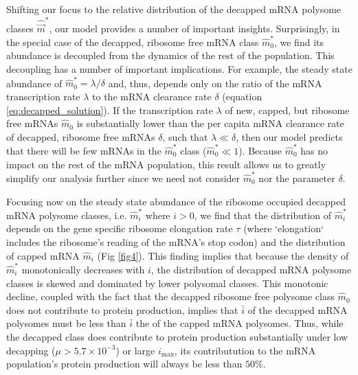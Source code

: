 \documentclass[10pt,letterpaper]{article}
\newcommand{\imax}{\ensuremath{{i_{\max}}}\xspace}
\newcommand{\mhat}{\ensuremath{\hat{m}}\xspace}
\newcommand{\mvec}{\ensuremath{\vec{m}}\xspace}
\newcommand{\mvechat}{\ensuremath{\hat{\mvec}}\xspace}
\newcommand{\mvechatstar}{\ensuremath{\mvechat^*}\xspace}
\newcommand{\MRL}{\ensuremath{\bar{i}}\xspace}
\begin{document}
Shifting our focus to the relative distribution of the decapped mRNA polysome classes \mvechatstar, our model provides a number of important insights.
Surprisingly, in the special case of the decapped, ribosome free mRNA class $\mhat_0^*$, we find its abundance is decoupled from the dynamics of the rest of the population.
This decoupling has a number of important implications.
For example, the steady state abundance of $\mhat_0^* = \lambda/\delta$ and, thus, depends only on the ratio of the mRNA transcription rate $\lambda$ to the mRNA clearance rate $\delta$ (equation \ref{eq:decapped_solution}).
If the transcription rate $\lambda$ of new, capped, but ribosome free mRNAs $\mhat_0$ is substantially lower than the per capita mRNA clearance rate of decapped, ribosome free mRNAs $\delta$, such that  $\lambda \ll \delta$, then our model predicts that there will be few mRNAs in the $\mhat_0^*$ class ($\mhat_0^* \ll 1$).
Because $\mhat^*_0$ has no impact on the rest of the mRNA population, this result allows us to greatly simplify our analysis further since we need not consider $\mhat_0^*$ nor the parameter $\delta$.

Focusing now on the steady state abundance of the ribosome occupied decapped mRNA polysome classes, i.e.  $\mhat_i^*$ where $i > 0$, we find that the distribution of $\mhat^*_i$  depends on the gene specific ribosome elongation rate $\tau$ (where `elongation`  includes the ribosome's reading of the mRNA's stop codon) and the distribution of capped mRNA $\mhat_i$ (Fig \ref{fig4}).
\label{item:protein_production} This finding implies that because the density of $\mhat^*_i$ monotonically decreases with $i$, the distribution of decapped mRNA polysome classes is skewed and dominated by lower polysomal classes.
This monotonic decline, coupled with the fact that the decapped ribosome free polysome class $\mhat_0$ does not contribute to protein production, implies that \MRL of the decapped mRNA polysomes must be less than \MRL the of the capped mRNA polysomes.
Thus, while the decapped class does contribute to protein production substantially under low decapping ($\mu> 5.7 \times 10^{-3}$) or large \imax, its contributution to the mRNA population's protein production will always be less than  $50\%$.
\end{document}

